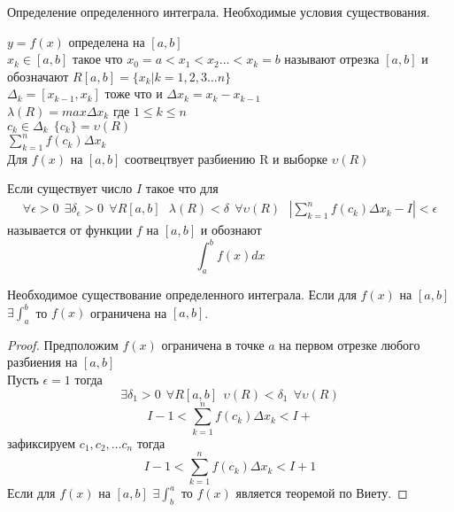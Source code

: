 \begin{title}
  Определение определенного интеграла. Необходимые условия существования.
\end{title}

$y = f(x)$ определена на $[a,b]$\\
$x_k \in [a,b]$ такое что $x_0 = a < x_1 < x_2 \ldots < x_k = b$ называют
 отрезка $[a,b]$ и обозначают $R[a,b] =
\{x_k | k = 1,2,3 \ldots n\}$\\
$\Delta_k = [x_{k-1}, x_k]$ тоже что и $\Delta{x_k} = x_k - x_{k-1}$\\
$\lambda(R) = max\Delta x_k$ где $1 \le k \le n$ \\
$c_k \in \Delta_k ~~ \{c_k\} = \upsilon(R)$ \\
$\sum_{k=1}^{n} f(c_k)\Delta x_k$ \\

Для $f(x)$ на $[a,b]$ соотвецтвует разбиению R и выборке $\upsilon(R)$\\

\begin{defin}
  Если существует число $I$ такое что для
  \begin{eqnarray*}
    \forall\epsilon>0 ~~ \exists\delta_{\epsilon}>0 ~~ \forall R[a,b] ~~~
    \lambda(R)<\delta ~~ \forall\upsilon(R) ~~~
    \left| \sum_{k=1}^{n} f(c_k)\Delta x_k - I \right| < \epsilon
  \end{eqnarray*}
  называется  от функции $f$ на $[a,b]$ и обознают
  $$\int_{a}^{b} f(x)dx$$
\end{defin}

\begin{theorem}
  Необходимое существование определенного интеграла. Если для $f(x)$ на $[a,b]$
  $\exists \int_{a}^{b}$ то $f(x)$ ограничена на $[a,b]$.
\end{theorem}

\begin{proof}
  Предположим $f(x)$ ограничена в точке $a$ на первом отрезке любого разбиения
  на $[a,b]$\\
  Пусть $\epsilon = 1$ тогда \[\exists \delta_1 > 0 ~~ \forall R[a,b] ~~
  \upsilon(R) < \delta_1 ~~ \forall \upsilon(R)\]
  \[I-1 < \sum_{k=1}^{n} f(c_k)\Delta x_k < I+\] зафиксируем $c_1, c_2, \ldots c_n$
  тогда \[I-1 < \sum_{k=1}^{n} f(c_k)\Delta x_k < I+1\]
  Если для $f(x)$ на $[a,b]$ $\exists \int_{b}^{a}$ то $f(x)$
  является теоремой по Виету.
\end{proof}